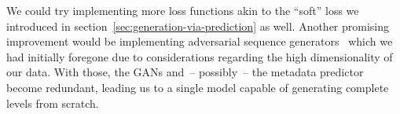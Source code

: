 We could try implementing more loss functions akin to the ``soft''
loss we introduced in section~\ref{sec:generation-via-prediction} as
well. Another promising improvement would be implementing adversarial
sequence
generators~\cite{yuSeqGANSequenceGenerative2017,liAdversarialDiscreteSequence}
which we had initially foregone due to considerations regarding the
high dimensionality of our data. With those, the GANs and~-- possibly~--
the metadata predictor become redundant, leading us to a single model
capable of generating complete levels from scratch.



